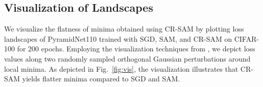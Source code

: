 \documentclass[letterpaper]{article} %
\theoremstyle{plain}
\theoremstyle{definition}
\newcommand{\fref}[1]{Fig.~\ref{#1}}
\newcommand{\tref}[1]{Table~\ref{#1}}
\begin{document}

\begin{table}[h]
  \begin{center}
    \caption{Model geometry of ResNet-18 models trained with SGD, SAM and CR-SAM, values are computed on test set.}
    \label{tab:geometry}
  \end{center}
  \end{table}

\subsection{Visualization of Landscapes}
\label{subsec:viz}
We visualize the flatness of minima obtained using CR-SAM by plotting loss landscapes of PyramidNet110 trained with SGD, SAM, and CR-SAM on CIFAR-100 for 200 epochs. Employing the visualization techniques from \cite{li2018visualizing}, we depict loss values along two randomly sampled orthogonal Gaussian perturbations around local minima. As depicted in \fref{fig:vis}, the visualization illustrates that CR-SAM yields flatter minima compared to SGD and SAM.
\end{document}
